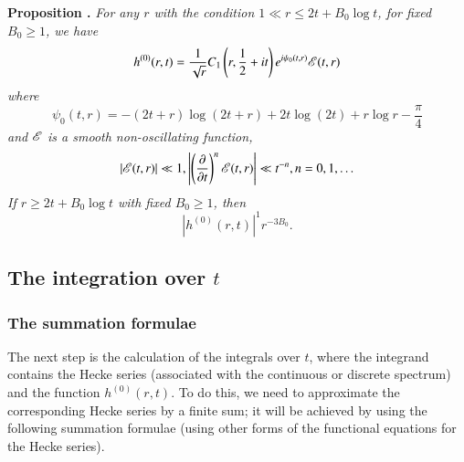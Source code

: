 \medskip
\noindent
{\bfseries Proposition .\label{art7-prop12}}
\textit{For any $r$ with the condition $1 \ll r \leqslant 2t  + B_0 \log t$, for fixed $B_0 \geqslant 1$, we have}
\begin{equation}
h^{(0)} (r,t) = \frac{1}{\sqrt{r}} C_1 \left(r, \frac{1}{2} + it \right) e^{i\psi_0 (t,r)} \mathscr{E} (t, r) \label{art7-eq7.53}
\end{equation}
\textit{where}
\begin{equation}
\psi_0 (t,r) = - (2t +r) \log (2t+r) + 2t \log (2t) + r \log r -\frac{\pi}{4} \label{art7-eq7.54}
\end{equation}\pageoriginale
\textit{and $\mathscr{E}$ is a smooth non-oscillating function,}
\begin{equation}
|\mathscr{E} (t,r )| \ll 1, \left|\left(\frac{\partial}{\partial t} \right)^n \mathscr{E} (t, r) \right| \ll t^{-n}, n = 0, 1, \ldots \label{art7-eq7.55}
\end{equation}
\textit{If $r \geqslant 2t + B_0 \log t$ with fixed $B_0 \geqslant 1$, then}
\begin{equation}
|h^{(0)} (r,t)|^1 r^{-3B_0}. \label{art7-eq7.56}
\end{equation}

\setcounter{section}{2}
\subsection{The integration over $t$}\label{art7-subsec2.7}
\subsubsection{The summation formulae}\label{art7-subsubsec2.7.1}

The next step is the calculation of the integrals over $t$, where the integrand contains the Hecke series (associated with the continuous or discrete spectrum) and the function $h^{(0)} (r,t)$. To do this, we need to approximate the corresponding Hecke series by a finite sum; it will be achieved by using the following summation formulae (using other forms of the functional equations for the Hecke series).

